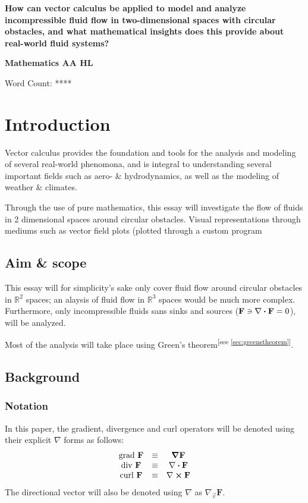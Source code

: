 \documentclass[a4paper,12pt]{article}
\renewcommand\divergence[1]{\nabla\vdot#1}
\renewcommand\curl[1]{\nabla\cp#1}
\newcommand{\fatf}{\mathbf{F}}         		%
\newcommand{\referto}[1]{\textsuperscript{\color{darkgray}\tiny[see \ref{#1}]}}	%
\newcommand{\researchquestion}
{
	How can vector calculus be applied to model and analyze 
	incompressible fluid flow in two-dimensional spaces with 
	circular obstacles, and what mathematical insights
	does this provide about real-world fluid systems?
}
\begin{document}
\begin{titlepage}
	\begin{center}
		\vspace*{0.5cm}
		\Large\textbf{\researchquestion}

		\vspace{1.5cm}
		\large\textbf{Mathematics AA HL}

		\vfill
		\color{darkgray} Word Count: ****
	\end{center}
\end{titlepage}

\tableofcontents\newpage

\section{Introduction}
Vector calculus provides the foundation and tools for the analysis and modeling of several real-world phenomona, and is integral to understanding several important fields such as aero- \& hydrodynamics, as well as the modeling of weather \& climates. 

Through the use of pure mathematics, this essay will investigate the flow of fluids in 2 dimensional spaces around circular obstacles. Visual representations through mediums such as vector field plots (plotted through a custom program
\subsection{Aim \& scope}
This essay will for simplicity's sake only cover fluid flow around circular obstacles in $\mathbb{R}^2$ spaces; an alaysis of fluid flow in $\mathbb{R}^3$ spaces would be much more complex.
Furthermore, only incompressible fluids sans sinks and sources ($\fatf\ni\divergence\fatf=0$), will be analyzed.

Most of the analysis will take place using Green's theorem\referto{sec:greenstheorem}.

\subsection{Background}
\subsubsection{Notation}
In this paper, the gradient, divergence and curl operators will be denoted using their explicit $\nabla$ forms as follows:
$$\begin{matrix}
	\mathrm{grad}\ \fatf&\equiv&\grad{\fatf}\\
	\mathrm{div}\ \fatf&\equiv&\divergence\fatf\\
	\mathrm{curl}\ \fatf&\equiv&\curl\fatf
\end{matrix}$$
The directional vector will also be denoted using $\nabla$ as $\nabla_{\vec{v}}\fatf$.
\end{document}
